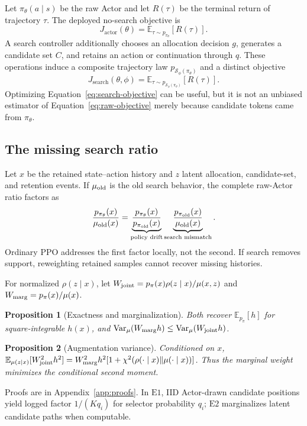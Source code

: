 \documentclass[10pt]{article}
\newcommand{\Eone}{\ensuremath{\mathrm{E1}}}
\newcommand{\Etwo}{\ensuremath{\mathrm{E2}}}
\newtheorem{proposition}{Proposition}
\begin{document}
Let $\pi_\theta(a\mid s)$ be the raw Actor and let $R(\tau)$ be the terminal
return of trajectory $\tau$.  The deployed no-search objective is
\begin{equation}
  J_{\mathrm{actor}}(\theta)
  = \mathbb{E}_{\tau\sim p_{\pi_\theta}}[R(\tau)].
  \label{eq:raw-objective}
\end{equation}
A search controller additionally chooses an allocation decision $g$, generates
a candidate set $C$, and retains an action or continuation through $q$.  These
operations induce a composite trajectory law $p_{\mathcal{S}_\phi(\pi_\theta)}$
and a distinct objective
\begin{equation}
  J_{\mathrm{search}}(\theta,\phi)
  = \mathbb{E}_{\tau\sim p_{\mathcal{S}_\phi(\pi_\theta)}}[R(\tau)].
  \label{eq:search-objective}
\end{equation}
Optimizing Equation~\ref{eq:search-objective} can be useful, but it is not an
unbiased estimator of Equation~\ref{eq:raw-objective} merely because candidate
tokens came from $\pi_\theta$.

\subsection{The missing search ratio}
Let \(x\) be the retained state--action history and \(z\) latent allocation,
candidate-set, and retention events.  If \(\mu_{\rm old}\) is the old search
behavior, the complete raw-Actor ratio factors as
\begin{equation}
\frac{p_{\pi_\theta}(x)}{\mu_{\rm old}(x)}
=\underbrace{\frac{p_{\pi_\theta}(x)}{p_{\pi_{\rm old}}(x)}}_{\text{policy drift}}
 \underbrace{\frac{p_{\pi_{\rm old}}(x)}{\mu_{\rm old}(x)}}_{\text{search mismatch}}.
\label{eq:ratio-factorization}
\end{equation}
Ordinary PPO addresses the first factor locally, not the second. If search
removes support, reweighting retained samples cannot recover missing histories.

For normalized \(\rho(z\mid x)\), let
\(W_{\rm joint}=p_\pi(x)\rho(z\mid x)/\mu(x,z)\) and
\(W_{\rm marg}=p_\pi(x)/\mu(x)\).
\begin{proposition}[Exactness and marginalization]\leavevmode\par
Both recover \(\mathbb E_{p_\pi}[h]\) for square-integrable \(h(x)\), and
\(\operatorname{Var}_\mu(W_{\rm marg}h)\le
\operatorname{Var}_\mu(W_{\rm joint}h)\).
\end{proposition}
\begin{proposition}[Augmentation variance]
Conditioned on \(x\),
\(\mathbb E_{\mu(z\mid x)}[W_{\rm joint}^2h^2]
=W_{\rm marg}^2h^2[1+\chi^2(\rho(\cdot\mid x)\Vert\mu(\cdot\mid x))]\).
Thus the marginal weight minimizes the conditional second moment.
\end{proposition}
Proofs are in Appendix~\ref{app:proofs}. In \Eone{}, IID Actor-drawn candidate
positions yield logged factor \(1/(Kq_i)\) for selector probability \(q_i\);
\Etwo{} marginalizes latent candidate paths when computable.
\end{document}
